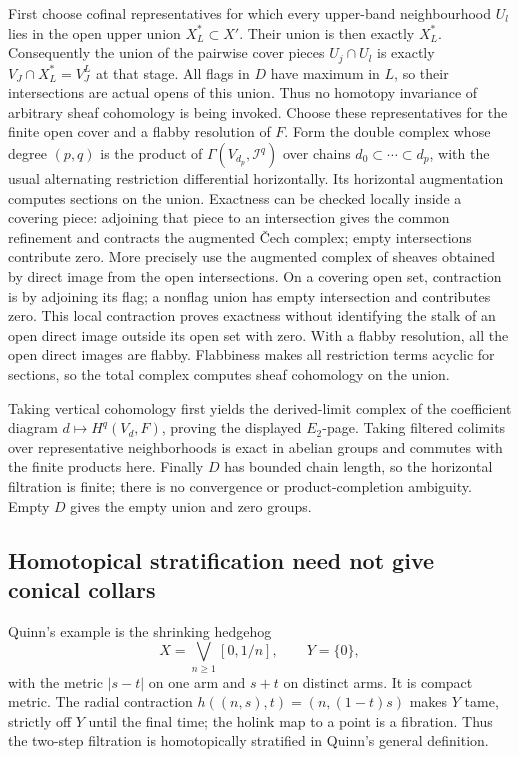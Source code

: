 \documentclass[11pt,a4paper]{article}
\theoremstyle{definition}
\begin{document}
First choose cofinal representatives for which every upper-band neighbourhood \(U_l\) lies in the open upper union \(X_L^*\subset X'\). Their union is then exactly \(X_L^*\). Consequently the union of the pairwise cover pieces \(U_j\cap U_l\) is exactly \(V_J\cap X_L^*=V_J^L\) at that stage. All flags in \(D\) have maximum in \(L\), so their intersections are actual opens of this union. Thus no homotopy invariance of arbitrary sheaf cohomology is being invoked. Choose these representatives for the finite open cover and a flabby resolution of \(F\). Form the double complex whose degree \((p,q)\) is the product of \(\Gamma(V_{d_p},\mathcal I^q)\) over chains \(d_0\subset\cdots\subset d_p\), with the usual alternating restriction differential horizontally. Its horizontal augmentation computes sections on the union. Exactness can be checked locally inside a covering piece: adjoining that piece to an intersection gives the common refinement and contracts the augmented \v{C}ech complex; empty intersections contribute zero. More precisely use the augmented complex of sheaves obtained by direct image from the open intersections. On a covering open set, contraction is by adjoining its flag; a nonflag union has empty intersection and contributes zero. This local contraction proves exactness without identifying the stalk of an open direct image outside its open set with zero. With a flabby resolution, all the open direct images are flabby. Flabbiness makes all restriction terms acyclic for sections, so the total complex computes sheaf cohomology on the union.

Taking vertical cohomology first yields the derived-limit complex of the coefficient diagram \(d\mapsto H^q(V_d,F)\), proving the displayed \(E_2\)-page. Taking filtered colimits over representative neighborhoods is exact in abelian groups and commutes with the finite products here. Finally \(D\) has bounded chain length, so the horizontal filtration is finite; there is no convergence or product-completion ambiguity. Empty \(D\) gives the empty union and zero groups.

\subsection{Homotopical stratification need not give conical collars}\label{c4.04-refuted-hss-alone-gives-conical-collars}

Quinn's example \cite[p.452]{Quinn} is the shrinking hedgehog \[
 X=\bigvee_{n\ge1}[0,1/n],\qquad Y=\{0\},
\] with the metric \(|s-t|\) on one arm and \(s+t\) on distinct arms. It is compact metric. The radial contraction \(h((n,s),t)=(n,(1-t)s)\) makes \(Y\) tame, strictly off \(Y\) until the final time; the holink map to a point is a fibration. Thus the two-step filtration is homotopically stratified in Quinn's general definition.
\end{document}
